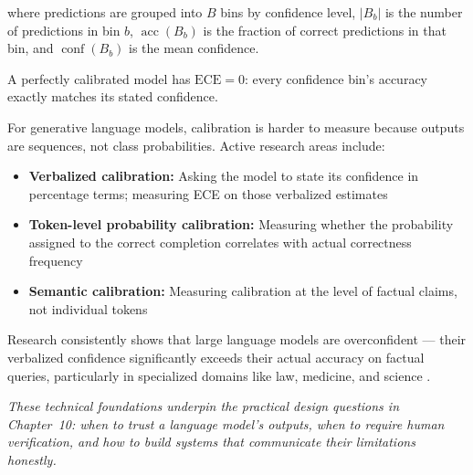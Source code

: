 where predictions are grouped into $B$ bins by confidence level, $|B_b|$ is the number of predictions in bin $b$, $\operatorname{acc}(B_b)$ is the fraction of correct predictions in that bin, and $\operatorname{conf}(B_b)$ is the mean confidence.

A perfectly calibrated model has $\text{ECE} = 0$: every confidence bin's accuracy exactly matches its stated confidence.

For generative language models, calibration is harder to measure because outputs are sequences, not class probabilities. Active research areas include:

\begin{itemize}
    \item \textbf{Verbalized calibration:} Asking the model to state its confidence in percentage terms; measuring ECE on those verbalized estimates \autocite{kadavath2022language}
    \item \textbf{Token-level probability calibration:} Measuring whether the probability assigned to the correct completion correlates with actual correctness frequency
    \item \textbf{Semantic calibration:} Measuring calibration at the level of factual claims, not individual tokens
\end{itemize}

Research consistently shows that large language models are overconfident --- their verbalized confidence significantly exceeds their actual accuracy on factual queries, particularly in specialized domains like law, medicine, and science \autocite{magesh2024hallucination}.

\bigskip
\noindent\textit{These technical foundations underpin the practical \hitl design questions in Chapter~10: when to trust a language model's outputs, when to require human verification, and how to build systems that communicate their limitations honestly.}
\apxnumoff
